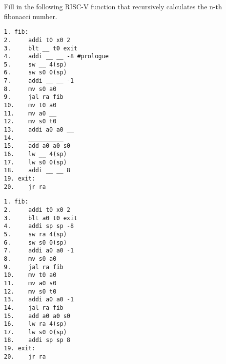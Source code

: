 \begin{blocksection}
\question Fill in the following RISC-V function that recursively calculates the n-th fibonacci number.

\begin{verbatim}
1. fib:
2.     addi t0 x0 2
3.     blt __ t0 exit
4.     addi __ __ -8 #prologue
5.     sw __ 4(sp)
6.     sw s0 0(sp)
7.     addi __ __ -1
8.     mv s0 a0
9.     jal ra fib
10.    mv t0 a0
11.    mv a0 __
12.    mv s0 t0
13.    addi a0 a0 __
14.    __________
15.    add a0 a0 s0
16.    lw __ 4(sp)
17.    lw s0 0(sp)
18.    addi __ __ 8
19. exit: 
20.    jr ra
\end{verbatim}
\end{blocksection}

\begin{solution}[0.5in]
\begin{verbatim}
1. fib:
2.     addi t0 x0 2
3.     blt a0 t0 exit
4.     addi sp sp -8
5.     sw ra 4(sp)
6.     sw s0 0(sp)
7.     addi a0 a0 -1
8.     mv s0 a0
9.     jal ra fib
10.    mv t0 a0
11.    mv a0 s0
12.    mv s0 t0
13.    addi a0 a0 -1
14.    jal ra fib
15.    add a0 a0 s0
16.    lw ra 4(sp)
17.    lw s0 0(sp)
18.    addi sp sp 8
19. exit: 
20.    jr ra

\end{verbatim}
\end{solution}

